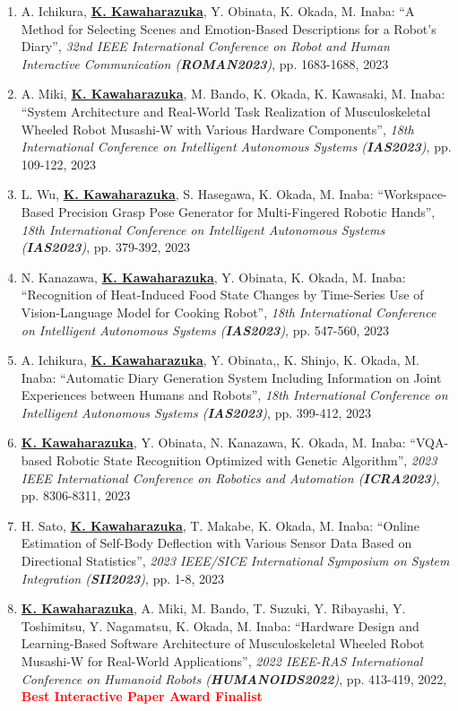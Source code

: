 \documentclass[letterpaper]{article}
\begin{document}
\begin{enumerate}
\item A. Ichikura, \underline{\textbf{K. Kawaharazuka}}, Y. Obinata, K. Okada, M. Inaba: ``A Method for Selecting Scenes and Emotion-Based Descriptions for a Robot's Diary'', \textit{32nd IEEE International Conference on Robot and Human Interactive Communication (\textit{\textbf{ROMAN2023}})}, pp. 1683-1688, 2023
\item A. Miki, \underline{\textbf{K. Kawaharazuka}}, M. Bando, K. Okada, K. Kawasaki, M. Inaba: ``System Architecture and Real-World Task Realization of Musculoskeletal Wheeled Robot Musashi-W with Various Hardware Components'', \textit{18th International Conference on Intelligent Autonomous Systems (\textit{\textbf{IAS2023}})}, pp. 109-122, 2023
\item L. Wu, \underline{\textbf{K. Kawaharazuka}}, S. Hasegawa, K. Okada, M. Inaba: ``Workspace-Based Precision Grasp Pose Generator for Multi-Fingered Robotic Hands'', \textit{18th International Conference on Intelligent Autonomous Systems (\textit{\textbf{IAS2023}})}, pp. 379-392, 2023
\item N. Kanazawa, \underline{\textbf{K. Kawaharazuka}}, Y. Obinata, K. Okada, M. Inaba: ``Recognition of Heat-Induced Food State Changes by Time-Series Use of Vision-Language Model for Cooking Robot'', \textit{18th International Conference on Intelligent Autonomous Systems (\textit{\textbf{IAS2023}})}, pp. 547-560, 2023
\item A. Ichikura, \underline{\textbf{K. Kawaharazuka}}, Y. Obinata,, K. Shinjo, K. Okada, M. Inaba: ``Automatic Diary Generation System Including Information on Joint Experiences between Humans and Robots'', \textit{18th International Conference on Intelligent Autonomous Systems (\textit{\textbf{IAS2023}})}, pp. 399-412, 2023
\item \underline{\textbf{K. Kawaharazuka}}, Y. Obinata, N. Kanazawa, K. Okada, M. Inaba: ``VQA-based Robotic State Recognition Optimized with Genetic Algorithm'', \textit{2023 IEEE International Conference on Robotics and Automation (\textit{\textbf{ICRA2023}})}, pp. 8306-8311, 2023
\item H. Sato, \underline{\textbf{K. Kawaharazuka}}, T. Makabe, K. Okada, M. Inaba: ``Online Estimation of Self-Body Deflection with Various Sensor Data Based on Directional Statistics'', \textit{2023 IEEE/SICE International Symposium on System Integration (\textit{\textbf{SII2023}})}, pp. 1-8, 2023
\item \underline{\textbf{K. Kawaharazuka}}, A. Miki, M. Bando, T. Suzuki, Y. Ribayashi, Y. Toshimitsu, Y. Nagamatsu, K. Okada, M. Inaba: ``Hardware Design and Learning-Based Software Architecture of Musculoskeletal Wheeled Robot Musashi-W for Real-World Applications'', \textit{2022 IEEE-RAS International Conference on Humanoid Robots (\textit{\textbf{HUMANOIDS2022}})}, pp. 413-419, 2022, \textbf{\textcolor{red}{Best Interactive Paper Award Finalist}}

\end{enumerate}
\end{document}

